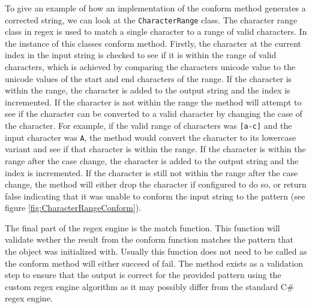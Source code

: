 To give an example of how an implementation of the conform method generates a corrected string, we can look at the \texttt{CharacterRange} class. The character range class in regex is used to match a single character to a range of valid characters. In the instance of this classes conform method. Firstly, the character at the current index in the input string is checked to see if it is within the range of valid characters, which is achieved by comparing the characters unicode value to the unicode values of the start and end characters of the range. If the character is within the range, the character is added to the output string and the index is incremented. If the character is not within the range the method will attempt to see if the character can be converted to a valid character by changing the case of the character. For example, if the valid range of characters was \texttt{[a-c]} and the input character was \texttt{A}, the method would convert the character to its lowercase variant and see if that character is within the range. If the character is within the range after the case change, the character is added to the output string and the index is incremented. If the character is still not within the range after the case change, the method will either drop the character if configured to do so, or return false indicating that it was unable to conform the input string to the pattern (see figure \ref{fig:CharacterRangeConform}).

The final part of the regex engine is the match function. This function will validate wether the result from the conform function matches the pattern that the object was initialized with. Usually this function does not need to be called as the conform method will either succeed of fail. The method exists as a validation step to ensure that the output is correct for the provided pattern using the custom regex engine algorithm as it may possibly differ from the standard C\# regex engine.
